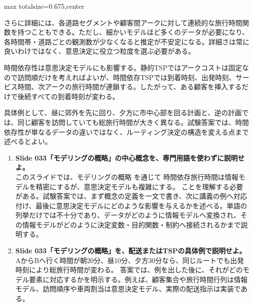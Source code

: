 \begin{adjustbox}{max totalsize={\textwidth}{0.675\textheight},center}
\begin{minipage}{\textwidth}
\begin{minipage}[t]{0.485\textwidth}
さらに詳細には、各道路セグメントや顧客間アークに対して連続的な旅行時間関数を持つこともできる。ただし、細かいモデルほど多くのデータが必要になり、各時間帯・道路ごとの観測数が少なくなると推定が不安定になる。詳細さは常に良いわけではなく、意思決定に役立つ粒度を選ぶ必要がある。\par
時間依存性は意思決定モデルにも影響する。静的TSPではアークコストは固定なので訪問順だけを考えればよいが、時間依存TSPでは到着時刻、出発時刻、サービス時間、次アークの旅行時間が連鎖する。したがって、ある顧客を挿入するだけで後続すべての到着時刻が変わる。\par
具体例として、昼に郊外を先に回り、夕方に市中心部を回る計画と、逆の計画では、同じ顧客を訪問していても総旅行時間が大きく異なる。試験答案では、時間依存性が単なるデータの違いではなく、ルーティング決定の構造を変える点まで述べるとよい。\par
{}
\begin{enumerate}
\item \textbf{Slide 033「モデリングの概略」の中心概念を、専門用語を使わずに説明せよ。}\\このスライドでは、モデリングの概略 を通じて 時間依存旅行時間は情報モデルを精密にするが、意思決定モデルも複雑にする。 ことを理解する必要がある。試験答案では、まず概念の定義を一文で書き、次に講義の例へ対応付け、最後に意思決定モデルにどのような影響を与えるかを述べる。単語の列挙だけでは不十分であり、データがどのように情報モデルへ変換され、その情報モデルがどのように決定変数・目的関数・制約へ接続されるかまで説明する。
\item \textbf{Slide 033「モデリングの概略」を、配送またはTSPの具体例で説明せよ。}\\AからBへ行く時間が朝20分、昼10分、夕方30分なら、同じルートでも出発時刻により総旅行時間が変わる。 答案では、例を出した後に、それがどのモデル要素に対応するかを明示する。例えば、顧客集合や旅行時間行列は情報モデル、訪問順序や車両割当は意思決定モデル、実際の配送指示は実装である。
\end{enumerate}
\end{minipage}
\end{minipage}
\end{adjustbox}

